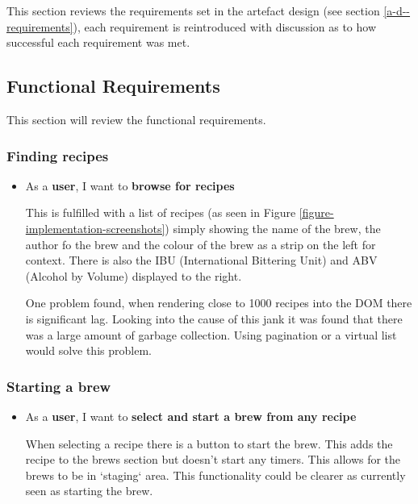 This section reviews the requirements set in the artefact design (see section \ref{a-d--requirements}), each requirement is reintroduced with discussion as to how successful each requirement was met.

\subsection{Functional Requirements} \label{t-e--requirements--functional}

This section will review the functional requirements.

\subsubsection{Finding recipes}

\begin{itemize}
  \item As a \textbf{user}, I want to \textbf{browse for recipes}

  This is fulfilled with a list of recipes (as seen in Figure \ref{figure-implementation-screenshots}) simply showing the name of the brew, the author fo the brew and the colour of the brew as a strip on the left for context. There is also the IBU (International Bittering Unit) and ABV (Alcohol by Volume) displayed to the right.

  One problem found, when rendering close to 1000 recipes into the DOM there is significant lag. Looking into the cause of this jank it was found that there was a large amount of garbage collection. Using pagination or a virtual list would solve this problem.

\end{itemize}

\subsubsection{Starting a brew}

\begin{itemize}
  \item As a \textbf{user}, I want to \textbf{select and start a brew from any recipe}

  When selecting a recipe there is a button to start the brew. This adds the recipe to the brews section but doesn't start any timers. This allows for the brews to be in `staging` area. This functionality could be clearer as currently seen as starting the brew.
\end{itemize}

